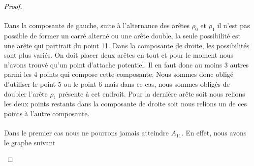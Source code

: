 \begin{proof}
  \paragraph{}
  Dans la composante de gauche, suite à l'alternance des arêtes $\rho_0$ et $\rho_1$ il n'est pas possible de former un carré alterné ou une arête double, la seule possibilité est une arête qui partirait du point 11. Dans la composante de droite, les possibilités sont plus variés. On doit placer deux arêtes en tout et pour le moment nous n'avons trouvé qu'un point d'attache potentiel. Il en faut donc au moins 3 autres parmi les 4 points qui compose cette composante. Nous sommes donc obligé d'utiliser le point 5 ou le point 6 mais dans ce cas, nous sommes obligés de doubler l'arête $\rho_1$ présente à cet endroit. Pour la dernière arête soit nous relions les deux points restants dans la composante de droite soit nous relions un de ces points à l'autre composante.

  \paragraph{}
  Dans le premier cas nous ne pourrons jamais atteindre $A_{11}$. En effet, nous avons le graphe suivant
  \begin{figure}[H]
    \begin{center}
\end{center}
\end{figure}
\end{proof}
